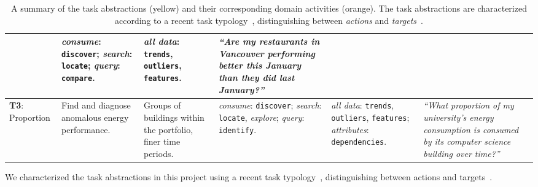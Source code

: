 \documentclass[journal]{vgtc}                %
\begin{document}
\begin{table}[bp]
\begin{center}
\begin{tabular}{p{}|>{\RaggedRight}p{}|>{\RaggedRight}p{}|>{\RaggedRight}p{}|>{\RaggedRight}p{}|>{\RaggedRight}p{}}
        & {\it consume}: {\tt discover}; {\it search}: {\tt locate}; {\it query}: {\tt compare}. 
        
        & {\it all data}: {\tt trends}, {\tt outliers}, {\tt features}.
        
        & {\it ``Are my restaurants in Vancouver performing better this January than they did last January?''}
        
        \\
        
        \hline
        
        \cellcolor{nmYellow} {\bf T3}: Proportion 
        
        & \cellcolor{nmOrange} Find and diagnose anomalous energy performance. 
        
        & Groups of buildings within the portfolio, finer time periods. 
        
        & {\it consume}: {\tt discover}; {\it search}: {\tt locate}, {\it explore}; {\it query}: {\tt identify}. 
        
        & {\it all data}: {\tt trends}, {\tt outliers}, {\tt features}; {\it attributes}: {\tt dependencies}. 
        
        & {\it ``What proportion of my university’s energy consumption is consumed by its computer science building over time?''}
        
        \\
        
        \hline  
        
    \end{tabular}
    \vspace{-0.3cm}
    \caption{A summary of the task abstractions (yellow) and their corresponding domain activities (orange). The task abstractions are characterized according to a recent task typology~\cite{Brehmer2013}, distinguishing between \textsl{actions} and \textsl{targets}~\cite{Munzner2014}.}
    \label{tab:task-abstractions}
    \end{center}
    \vspace{-0.6cm}
\end{table}

We characterized the task abstractions in this project using a recent task typology~\cite{Brehmer2013}, distinguishing between actions and targets~\cite{Munzner2014}.
\end{document}

